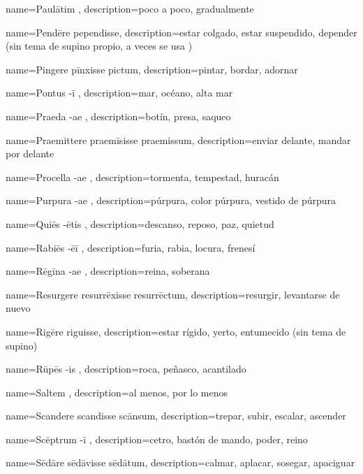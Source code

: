 {name={Paulātim },
description={poco a poco, gradualmente}}

{name={Pendēre pependisse},
description={estar colgado, estar suspendido, depender (sin tema de supino propio, a veces se usa )}}

{name={Pingere pīnxisse pictum},
description={pintar, bordar, adornar}}

{name={Pontus -ī },
description={mar, océano, alta mar}}

{name={Praeda -ae },
description={botín, presa, saqueo}}

{name={Praemittere praemīsisse praemissum},
description={enviar delante, mandar por delante}}

{name={Procella -ae },
description={tormenta, tempestad, huracán}}

{name={Purpura -ae },
description={púrpura, color púrpura, vestido de púrpura}}

{name={Quiēs -ētis },
description={descanso, reposo, paz, quietud}}

{name={Rabiēs -ēī },
description={furia, rabia, locura, frenesí}}

{name={Rēgīna -ae },
description={reina, soberana}}

{name={Resurgere resurrēxisse resurrēctum},
description={resurgir, levantarse de nuevo}}

{name={Rigēre riguisse},
description={estar rígido, yerto, entumecido (sin tema de supino)}}

{name={Rūpēs -is },
description={roca, peñasco, acantilado}}

{name={Saltem },
description={al menos, por lo menos}}

{name={Scandere scandisse scānsum},
description={trepar, subir, escalar, ascender}}

{name={Scēptrum -ī },
description={cetro, bastón de mando, poder, reino}}

{name={Sēdāre sēdāvisse sēdātum},
description={calmar, aplacar, sosegar, apaciguar}}


